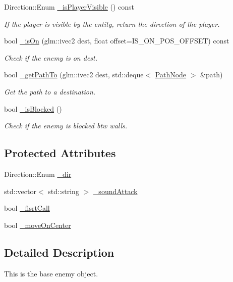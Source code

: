 \begin{DoxyCompactItemize}
Direction\+::\+Enum \hyperlink{class_a_enemy_a7909b6882d5dba58d147decadc256cba}{\+\_\+is\+Player\+Visible} () const
\begin{DoxyCompactList}\small\item\em If the player is visible by the entity, return the direction of the player. \end{DoxyCompactList}\item 
bool \hyperlink{class_a_enemy_a250a33c7294ac9d6b125eebe8acd51e3}{\+\_\+is\+On} (glm\+::ivec2 dest, float offset=I\+S\+\_\+\+O\+N\+\_\+\+P\+O\+S\+\_\+\+O\+F\+F\+S\+ET) const
\begin{DoxyCompactList}\small\item\em Check if the enemy is on dest. \end{DoxyCompactList}\item 
bool \hyperlink{class_a_enemy_a5ff3b836a7a98499a1a4019f7238b4d0}{\+\_\+get\+Path\+To} (glm\+::ivec2 dest, std\+::deque$<$ \hyperlink{struct_path_node}{Path\+Node} $>$ \&path)
\begin{DoxyCompactList}\small\item\em Get the path to a destination. \end{DoxyCompactList}\item 
bool \hyperlink{class_a_enemy_a4348865dc5c245e2d88e31296847e1a6}{\+\_\+is\+Blocked} ()
\begin{DoxyCompactList}\small\item\em Check if the enemy is blocked btw walls. \end{DoxyCompactList}\end{DoxyCompactItemize}
\subsection*{Protected Attributes}
\begin{DoxyCompactItemize}
\item 
Direction\+::\+Enum \hyperlink{class_a_enemy_af85a958024c72d9c0f522be466c75092}{\+\_\+dir}
\item 
std\+::vector$<$ std\+::string $>$ \hyperlink{class_a_enemy_a4b3d010b8630c401730fbee2bfeb2a6b}{\+\_\+sound\+Attack}
\item 
bool \hyperlink{class_a_enemy_a112cb8a927706e1a563119258239f4b6}{\+\_\+fisrt\+Call}
\item 
bool \hyperlink{class_a_enemy_af05841272b0bfa864dcfffaeb1e29a9b}{\+\_\+move\+On\+Center}
\end{DoxyCompactItemize}


\subsection{Detailed Description}
This is the base enemy object. 


